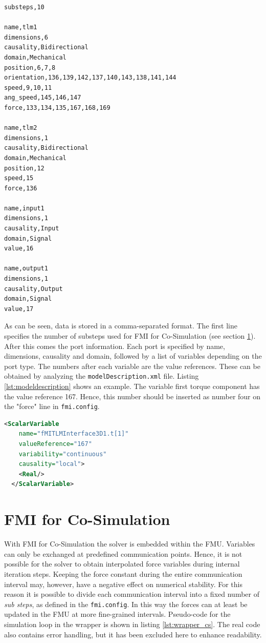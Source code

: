 \begin{lstlisting}[language=fmiconfig,basicstyle=\ttfamily,floatplacement=ht,caption=A configuration file maps value references to TLM variables,label=lst:fmiconfig]
substeps,10

name,tlm1
dimensions,6
causality,Bidirectional
domain,Mechanical
position,6,7,8
orientation,136,139,142,137,140,143,138,141,144
speed,9,10,11
ang_speed,145,146,147
force,133,134,135,167,168,169

name,tlm2
dimensions,1
causality,Bidirectional
domain,Mechanical
position,12
speed,15
force,136

name,input1
dimensions,1
causality,Input
domain,Signal
value,16

name,output1
dimensions,1
causality,Output
domain,Signal
value,17
\end{lstlisting}
\newpage
As can be seen, data is stored in a comma-separated format.
The first line specifies the number of substeps used for FMI for Co-Simulation (see section \ref{sec:fmi_cs}).
After this comes the port information.
Each port is specified by name, dimensions, causality and domain, followed by a list of variables depending on the port type.
The numbers after each variable are the value references.
These can be obtained by analyzing the \texttt{modelDescription.xml} file.
Listing \ref{lst:modeldescription} shows an example.
The variable first torque component has the value reference 167.
Hence, this number should be inserted as number four on the "force" line in \texttt{fmi.config}.

\begin{lstlisting}[language=XML,float,floatplacement=ht,caption=Value references for variables are obtained from \texttt{modelDescription.xml},label=lst:modeldescription]
  <ScalarVariable
    name="fMITLMInterface3D1.t[1]"
    valueReference="167"
    variability="continuous"
    causality="local">
    <Real/>
  </ScalarVariable>
\end{lstlisting}


\clearpage
\section{FMI for Co-Simulation}
\label{sec:fmi_cs}
With FMI for Co-Simulation the solver is embedded within the FMU.
Variables can only be exchanged at predefined communication points.
Hence, it is not possible for the solver to obtain interpolated force variables during internal iteration steps.
Keeping the force constant during the entire communication interval may, however, have a negative effect on numerical stability.
For this reason it is possible to divide each communication interval into a fixed number of \textit{sub steps}, as defined in the \texttt{fmi.config}.
In this way the forces can at least be updated in the FMU at more fine-grained intervals.
Pseudo-code for the simulation loop in the wrapper is shown in listing \ref{lst:wrapper_cs}.
The real code also contains error handling, but it has been excluded here to enhance readability.

